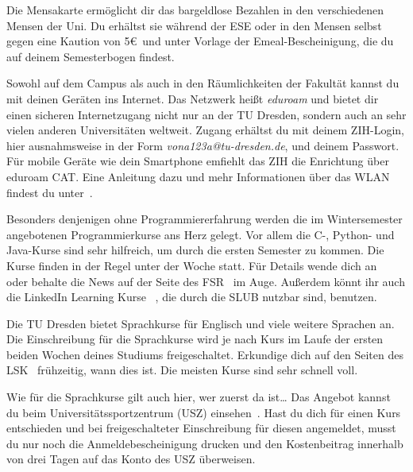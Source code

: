 \begin{itemize}[leftmargin=*]
Die Mensakarte ermöglicht dir das bargeldlose Bezahlen in den verschiedenen
Mensen der Uni. Du erhältst sie während der ESE oder in den Mensen selbst gegen
eine Kaution von 5\euro\ und unter Vorlage der Emeal-Bescheinigung, die du auf
deinem Semesterbogen findest.

\pagebreak

Sowohl auf dem Campus als auch in den Räumlichkeiten der Fakultät kannst du mit
deinen Geräten ins Internet. Das Netzwerk heißt \textit{eduroam} und bietet dir
einen sicheren Internetzugang nicht nur an der TU Dresden, sondern auch an sehr
vielen anderen Universitäten weltweit. Zugang erhältst du mit deinem ZIH-Login,
hier ausnahmsweise in der Form \textit{vona123a@tu-dresden.de}, und deinem
Passwort. Für mobile Geräte wie dein Smartphone emfiehlt das ZIH die Enrichtung über eduroam CAT. 
Eine Anleitung dazu und mehr Informationen über das WLAN findest du unter~.

Besonders denjenigen ohne Programmiererfahrung werden die im Wintersemester
angebotenen Programmierkurse ans Herz gelegt. Vor allem die C-, Python- und Java-Kurse
sind sehr hilfreich, um durch die ersten Semester zu kommen. Die Kurse finden in
der Regel unter der Woche statt. Für Details
wende dich an~ oder behalte die News auf der
Seite des FSR~ im Auge. Außerdem könnt ihr auch die LinkedIn Learning Kurse ~, die durch die SLUB nutzbar sind, benutzen.

\label{sec:sprache}
Die TU Dresden bietet Sprachkurse für Englisch und viele weitere Sprachen an.
Die Einschreibung für die Sprachkurse wird je nach Kurs im Laufe der ersten
beiden Wochen deines Studiums freigeschaltet. Erkundige dich auf den Seiten des
LSK~ frühzeitig, wann dies ist. Die
meisten Kurse sind sehr schnell voll.

\label{sec:sport}
Wie für die Sprachkurse gilt auch hier, wer zuerst da ist\ldots{} Das Angebot
kannst du beim Universitätssportzentrum (USZ) einsehen~. Hast du dich für einen Kurs entschieden und
bei freigeschalteter Einschreibung für diesen angemeldet, musst du nur noch die
Anmeldebescheinigung drucken und den Kostenbeitrag innerhalb von drei Tagen auf
das Konto des USZ überweisen.


\end{itemize}
